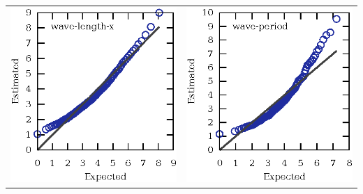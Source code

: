 \documentclass[14pt,aspectratio=169]{beamer}
\begin{document}
\begin{frame}
\begin{columns}
\begin{column}{0.5\textwidth}
\begin{tabular}{ll}
					\addlinespace
					\includegraphics[scale=0.5]{propagating-wave-length-x} &
					\includegraphics[scale=0.5]{propagating-wave-period} \\
				\end{tabular}
			\end{column}
		\end{columns}
	\end{frame}
\end{document}
